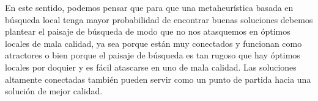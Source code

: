 En este sentido, podemos pensar que para que una metaheurística basada en búsqueda local tenga mayor probabilidad de encontrar buenas soluciones debemos plantear el paisaje de búsqueda de modo que no nos atasquemos en óptimos locales de mala calidad, ya sea porque están muy conectados y funcionan como atractores o bien porque el paisaje de búsqueda es tan rugoso que hay óptimos locales por doquier y es fácil atascarse en uno de mala calidad. Las soluciones altamente conectadas también pueden servir como un punto de partida hacia una solución de mejor calidad. 

